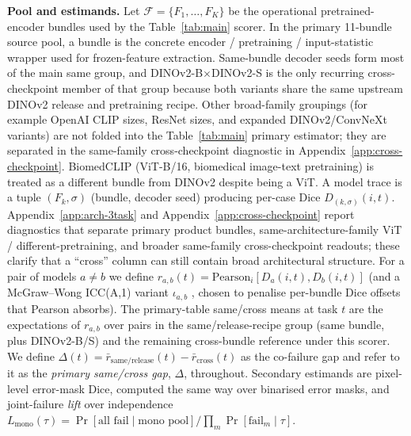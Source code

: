 \documentclass{article}
\begin{document}
\textbf{Pool and estimands.} Let $\mathcal{F}{=}\{F_1,\dots,F_K\}$ be the operational pretrained-encoder bundles used by the Table~\ref{tab:main} scorer. In the primary 11-bundle source pool, a bundle is the concrete encoder / pretraining / input-statistic wrapper used for frozen-feature extraction. Same-bundle decoder seeds form most of the main same group, and DINOv2-B$\times$DINOv2-S is the only recurring cross-checkpoint member of that group because both variants share the same upstream DINOv2 release and pretraining recipe. Other broad-family groupings (for example OpenAI CLIP sizes, ResNet sizes, and expanded DINOv2/ConvNeXt variants) are not folded into the Table~\ref{tab:main} primary estimator; they are separated in the same-family cross-checkpoint diagnostic in Appendix~\ref{app:cross-checkpoint}. BiomedCLIP (ViT-B/16, biomedical image-text pretraining) is treated as a different bundle from DINOv2 despite being a ViT. A model trace is a tuple $(F_k, \sigma)$ (bundle, decoder seed) producing per-case Dice $D_{(k,\sigma)}(i, t)$. Appendix~\ref{app:arch-3task} and Appendix~\ref{app:cross-checkpoint} report diagnostics that separate primary product bundles, same-architecture-family ViT / different-pretraining, and broader same-family cross-checkpoint readouts; these clarify that a ``cross'' column can still contain broad architectural structure. For a pair of models $a{\neq}b$ we define $r_{a,b}(t){=}\mathrm{Pearson}_i [D_a(i,t), D_b(i,t)]$ (and a McGraw--Wong ICC(A,1) variant $\iota_{a,b}$ \citep{mcgraw1996forming}, chosen to penalise per-bundle Dice offsets that Pearson absorbs). The primary-table same/cross means at task $t$ are the expectations of $r_{a,b}$ over pairs in the same/release-recipe group (same bundle, plus DINOv2-B/S) and the remaining cross-bundle reference under this scorer. We define $\Delta(t){=}\bar r_{\mathrm{same/release}}(t){-}\bar r_{\mathrm{cross}}(t)$ as the co-failure gap and refer to it as the \emph{primary same/cross gap}, $\Delta$, throughout. Secondary estimands are pixel-level error-mask Dice, computed the same way over binarised error masks, and joint-failure \emph{lift} over independence $L_{\text{mono}}(\tau){=}\Pr[\text{all fail} \mid\text{mono pool}] / \prod_m \Pr[\text{fail}_m \mid \tau]$.
\end{document}
